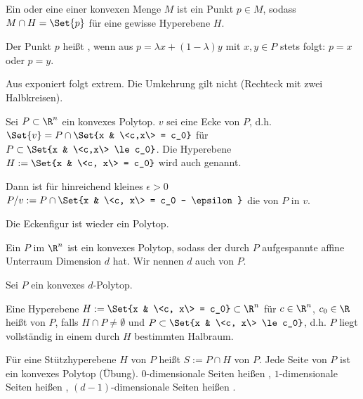 \begin{df}
    Ein  oder eine  einer konvexen Menge $M$ ist ein Punkt $p \in M$, sodass $M \cap H = \Set{p}$ für eine gewisse Hyperebene $H$.

    Der Punkt $p$ heißt , wenn aus $p = \lambda x + (1-\lambda)y$ mit $x,y \in P$ stets folgt: $p = x$ oder $p = y$.
    \begin{note}
        Aus exponiert folgt extrem.
        Die Umkehrung gilt nicht (Rechteck mit zwei Halbkreisen).
    \end{note}
\end{df}

\begin{df}[Eckenfigur]
    Sei $P \subset \R^n$ ein konvexes Polytop.
    $v$ sei eine Ecke von $P$, d.h.
    \begin{math}
        \Set{v} =
        P \cap \Set{x & \<c,x\> = c_0}
    \end{math}
    für $P \subset \Set{x & \<c,x\> \le c_0}$.
    Die Hyperebene $H := \Set{x & \<c, x\> = c_0}$ wird auch  genannt.

    Dann ist für hinreichend kleines $\epsilon > 0$
    \begin{math}
        P / v := P \cap \Set{x & \<c, x\> = c_0 - \epsilon}
    \end{math}
    die  von $P$ in $v$.
    \begin{note}
        Die Eckenfigur ist wieder ein Polytop.
    \end{note}
\end{df}


\begin{df}
    Ein  $P$ im $\R^n$ ist ein konvexes Polytop, sodass der durch $P$ aufgespannte affine Unterraum Dimension $d$ hat.
    Wir nennen $d$ auch  von $P$.
\end{df}

\begin{df}
    Sei $P$ ein konvexes $d$-Polytop.

    Eine Hyperebene $H := \Set{x & \<c, x\> = c_0} \subset \R^n$ für $c \in \R^n$, $c_0 \in \R$ heißt  von $P$, falls $H \cap P \neq \emptyset$ und $P \subset \Set{x & \<c, x\> \le c_0}$, d.h. $P$ liegt vollständig in einem durch $H$ bestimmten Halbraum.

    Für eine Stützhyperebene $H$ von $P$ heißt $S := P \cap H$  von $P$.
    Jede Seite von $P$ ist ein konvexes Polytop (Übung).
    $0$-dimensionale Seiten heißen , $1$-dimensionale Seiten heißen , $(d-1)$-dimensionale Seiten heißen .
\end{df}

